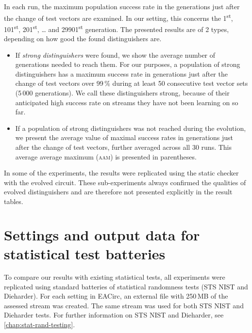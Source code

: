 \documentclass[12pt,oneside]{fithesis2}
\newcommand{\squarebullet}{\textcolor{black}{\raisebox{0.15em}{\rule{4pt}{4pt}}}}
\newenvironment{myItemize}{
  \begin{itemize}[leftmargin=2em,rightmargin=1em,itemsep=\parskip ,parsep=0em,topsep=0em,partopsep=0em]
  \renewcommand{\labelitemi}{\squarebullet}
  \renewcommand{\labelitemii}{$\diamond$}
}{
  \end{itemize}
}
\begin{document}
In each run, the maximum population success rate in the generations just after the change of test vectors are examined.
In our setting, this concerns the 1\textsuperscript{st}, 101\textsuperscript{st}, 201\textsuperscript{st}, \dots{} 
and 29901\textsuperscript{st} generation.
The presented results are of 2 types, depending on how good the found distinguishers are.
\begin{myItemize}
\item If \textit{strong distinguishers} were found, we show the average number of generations needed
to reach them. For our purposes, a population of strong distinguishers has a maximum success rate in generations just
after the change of test vectors over 99\,\% during at least 50 consecutive test vector sets (5\,000 generations).
We call these distinguishers strong, because of their anticipated high success rate on streams they have not been learning on so far.
\item If a population of strong distinguishers was not reached during the evolution, 
we present the average value of maximal success rates in generations just after the change of test vectors,
further averaged across all 30 runs. This average average maximum (\textsc{aam}) is presented in parentheses.
\end{myItemize}

\noindent
In some of the experiments, the results were replicated using the static checker with the evolved circuit.
These sub-experiments always confirmed the qualities of evolved distinguishers and are therefore not presented explicitly
in the result tables.

\section{Settings and output data for statistical test batteries}
\label{sec:settings-statistics}

To compare our results with existing statistical tests, all experiments were replicated using standard batteries of statistical
randomness tests (STS NIST and Dieharder). 
For each setting in EACirc, an external file with 250\,MB of the assessed stream was created.
The same stream was used for both STS NIST and Dieharder tests. For further information on STS NIST and Dieharder, 
see \autoref{chap:stat-rand-testing}.
\end{document}
